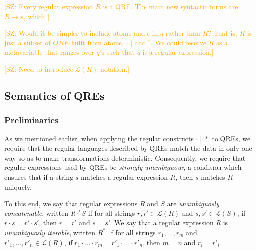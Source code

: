 \documentclass{svproc}
\newcommand{\FINISH}[3]{\ifdraft\textcolor{#1}{[#2: #3]}\fi}
\newcommand{\saz}[1]{\FINISH{orange}{SZ}{#1}}
\begin{document}
\saz{Every regular expression $R$ is a QRE.  The main new syntactic
forms are:
$R \mapsto s$, which }

\saz{Would it be simpler to include atoms and $\epsilon$ in $q$ rather than $R$?  That is, $R$ is
  just a subset of $QRE$ built from atoms, $\cdot$ $|$ and ${}^*$.  We could
  reserve $R$ as a metavariable that ranges over $q$'s such that $q$ is a
  regular expression.}

\saz{Need to introduce $\mathcal{L}(R)$ notation.}

\iffalse
Quotient Regular Expressions (or QREs) enable us to give richer specifications
for data formats than ordinary regular expressions. More concretely,
  All data to be transformed must match $W(q)$, the ``whole'' regular
  expression of $q$. However, before transforming the using a lens, the data
  will be quotiented out by the equivalence relation $EqRel(q)$ which has $K(q)$
  as a complete set of representatives. That is, for each string $w \in
  W(q)$, there is a unique $k \in K(q)$ such that $w \; EqRel(q) \; k$). This
  unique representative $k$ is chosen using the ``canonizing'' function
  $Canonizer(q)$.
  \fi
  
\subsection{Semantics of QREs}
\subsubsection{Preliminaries}
As we mentioned earlier, when applying the regular constructs $\cdot
\; | \;  *$ to QREs, we require that the regular languages
described by QREs match the data in only one way so as to make transformations
deterministic. Consequently, we require that regular expressions used
by QREs be \textit{strongly unambiguous}, a condition which ensures that if a
string $s$ matches a regular expression $R$, then $s$ matches $R$ uniquely.

To this end, we say that regular expressions $R$ and $S$ are
\textit{unambiguosly concatenable}, written $R \cdot^! S$ if for all strings
$r, r' \in \mathcal{L}(R)$ and $s, s' \in \mathcal{L}(S)$, if $r \cdot s = r'
\cdot s'$, then $r = r'$ and $s = s'$. We say that a regular expression $R$ is
\textit{unambiguosly iterable}, written $R^{*!}$ if for all strings $r_1,
\ldots, r_m$ and $r'_1, \ldots, r'_n \in \mathcal{L}(R)$, if $r_1 \cdot \ldots
\cdot r_m = r'_1 \cdot \ldots \cdot r'_n$, then $m = n$ and $r_i = r'_i$.
\end{document}
